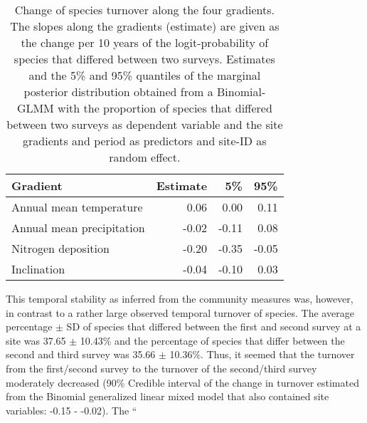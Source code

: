 \documentclass[fleqn,10pt,lineno]{wlpeerj} %
\theoremstyle{definition}
\theoremstyle{definition}
\theoremstyle{definition}
\theoremstyle{remark}
\begin{document}
\begin{table}

\caption{\label{tab:turnovertab}Change of species turnover along the four gradients. The slopes along the gradients (estimate) are given as the change per 10 years of the logit-probability of species that differed between two surveys. Estimates and the 5\% and 95\% quantiles of the marginal posterior distribution obtained from a Binomial-GLMM with the proportion of species that differed between two surveys as dependent variable and the site gradients and period as predictors and site-ID as random effect.}
\centering
\begin{tabular}[t]{lrrr}
\toprule
Gradient & Estimate & 5\% & 95\%\\
\midrule
Annual mean temperature & 0.06 & 0.00 & 0.11\\
Annual mean precipitation & -0.02 & -0.11 & 0.08\\
Nitrogen deposition & -0.20 & -0.35 & -0.05\\
Inclination & -0.04 & -0.10 & 0.03\\
\bottomrule
\end{tabular}
\end{table}

This temporal stability as inferred from the community measures was,
however, in contrast to a rather large observed temporal turnover of
species. The average percentage \(\pm\) SD of species that differed
between the first and second survey at a site was 37.65 \(\pm\) 10.43\%
and the percentage of species that differ between the second and third
survey was 35.66 \(\pm\) 10.36\%. Thus, it seemed that the turnover from
the first/second survey to the turnover of the second/third survey
moderately decreased (90\% Credible interval of the change in turnover
estimated from the Binomial generalized linear mixed model that also
contained site variables: -0.15 - -0.02). The ``
\end{document}
